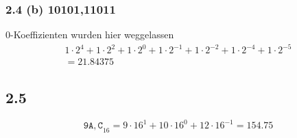 \documentclass[11pt,a4paper]{article}
\begin{document}
\subsubsection{2.4 (b) 10101,11011}
0-Koeffizienten wurden hier weggelassen
\begin{align*}
1\cdot2^4 + 1\cdot2^2 + 1\cdot2^0 + 1\cdot2^{-1} + 1\cdot2^{-2} + 1\cdot2^{-4} + 1\cdot2^{-5}\\
= 21.84375
\end{align*}


\subsection{2.5}
\begin{equation*}
\mathtt{9A,C}_{16} = 9\cdot16^1 + 10\cdot16^0 + 12\cdot16^{-1} = 154.75
\end{equation*}

\newpage



\end{document}
